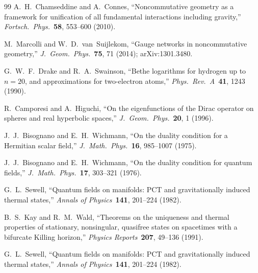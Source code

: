 \documentclass[11pt]{article}
\begin{document}
\begin{thebibliography}{99}
A.~H.~Chamseddine and A.~Connes, ``Noncommutative geometry as a
framework for unification of all fundamental interactions
including gravity,'' \textit{Fortsch.\ Phys.}\ \textbf{58}, 553--600
(2010).

M.~Marcolli and W.~D.~van~Suijlekom, ``Gauge networks in
noncommutative geometry,'' \textit{J.\ Geom.\ Phys.}\ \textbf{75},
71 (2014); arXiv:1301.3480.

G.~W.~F.~Drake and R.~A.~Swainson, ``Bethe logarithms for hydrogen up
to $n=20$, and approximations for two-electron atoms,''
\textit{Phys.\ Rev.\ A}\ \textbf{41}, 1243 (1990).

R.~Camporesi and A.~Higuchi, ``On the eigenfunctions of the Dirac
operator on spheres and real hyperbolic spaces,''
\textit{J.\ Geom.\ Phys.}\ \textbf{20}, 1 (1996).


J.~J.~Bisognano and E.~H.~Wichmann, ``On the duality condition for a
Hermitian scalar field,'' \textit{J.\ Math.\ Phys.}\ \textbf{16},
985--1007 (1975).

J.~J.~Bisognano and E.~H.~Wichmann, ``On the duality condition for
quantum fields,'' \textit{J.\ Math.\ Phys.}\ \textbf{17},
303--321 (1976).

G.~L.~Sewell, ``Quantum fields on manifolds: PCT and gravitationally
induced thermal states,'' \textit{Annals of Physics}\ \textbf{141},
201--224 (1982).

B.~S.~Kay and R.~M.~Wald, ``Theorems on the uniqueness and thermal
properties of stationary, nonsingular, quasifree states on spacetimes
with a bifurcate Killing horizon,'' \textit{Physics Reports}\
\textbf{207}, 49--136 (1991).

G.~L.~Sewell, ``Quantum fields on manifolds: PCT and gravitationally
induced thermal states,'' \textit{Annals of Physics}\ \textbf{141},
201--224 (1982).


\end{thebibliography}
\end{document}
